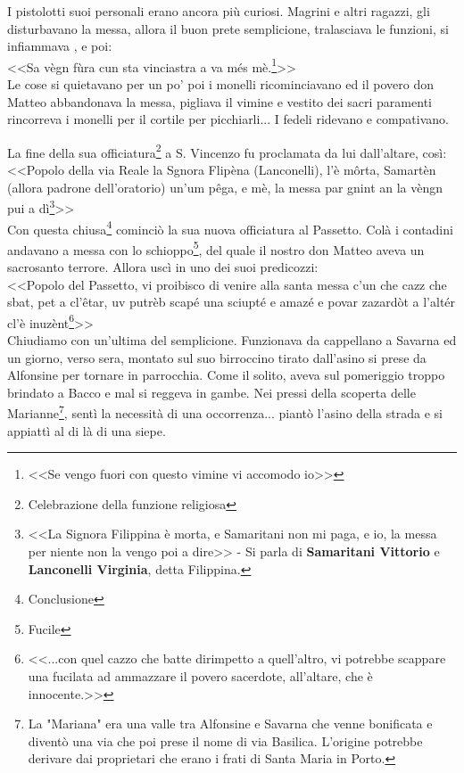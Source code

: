 I pistolotti suoi personali erano ancora più curiosi. Magrini e altri ragazzi, gli disturbavano la messa, allora il buon prete semplicione, tralasciava le funzioni, si infiammava , e poi:\\
\indent <<Sa vègn fùra cun sta vinciastra a va més mè.\footnote{<<Se vengo fuori con questo vimine vi accomodo io>>}>>\\
\indent Le cose si quietavano per un po' poi i monelli ricominciavano ed il povero don Matteo abbandonava la messa, pigliava il vimine e vestito dei sacri paramenti rincorreva i monelli per il cortile per picchiarli... I fedeli ridevano e compativano. 

La fine della sua officiatura\footnote{Celebrazione della funzione religiosa} a S. Vincenzo fu proclamata da lui dall'altare, così:\\
\indent <<Popolo della via Reale la Sgnora Flipèna (Lanconelli), l'è môrta, Samartèn (allora padrone dell'oratorio) un'um pêga, e mè, la messa par gnint an la vèngn pui a dì\footnote{<<La Signora Filippina è morta, e Samaritani non mi paga, e io, la messa per niente non la vengo poi a dire>> - Si parla di \textbf{Samaritani Vittorio} e \textbf{Lanconelli Virginia}, detta Filippina.}>>\\
Con questa chiusa\footnote{Conclusione} cominciò la sua nuova officiatura al Passetto. Colà i contadini andavano a messa con lo schioppo\footnote{Fucile}, del quale il nostro don Matteo aveva un sacrosanto terrore. Allora uscì in uno dei suoi predicozzi:\\
\indent <<Popolo del Passetto, vi proibisco di venire alla santa messa c'un che cazz che sbat, pet a cl'êtar, uv putrèb scapé una sciupté e amazé e povar zazardòt a l'altér cl'è inuzènt\footnote{<<...con quel cazzo che batte dirimpetto a quell'altro, vi potrebbe scappare una fucilata ad ammazzare il povero sacerdote, all'altare, che è innocente.>>}>>\\

Chiudiamo con un'ultima del semplicione. Funzionava da cappellano a Savarna ed un giorno, verso sera, montato sul suo birroccino tirato dall'asino si prese da Alfonsine per tornare in parrocchia. Come il solito, aveva sul pomeriggio troppo brindato a Bacco e mal si reggeva in gambe. Nei pressi della scoperta delle Marianne\footnote{La "Mariana" era una valle tra Alfonsine e Savarna che venne bonificata e diventò una via che poi prese il nome di via Basilica. L'origine potrebbe derivare dai proprietari che erano i frati di Santa Maria in Porto.}, sentì la necessità di una occorrenza... piantò l'asino della strada e si appiattì al di là di una siepe.

